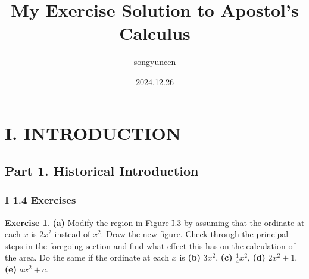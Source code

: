 \documentclass[11pt,a4paper]{book}
\title{My Exercise Solution to Apostol's Calculus}
\author{songyuncen}
\date{2024.12.26}
\theoremstyle{definition}
\newtheorem{exercise}{Exercise}
\begin{document}
\maketitle
\chapter*{I. INTRODUCTION}
\section*{Part 1. Historical Introduction}
\subsection*{I 1.4 Exercises}


\begin{exercise}
  \textbf{(a)} Modify the region in Figure I.3 by assuming that the ordinate at each $x$  is $2x^2$ instead of $x^2$.
  Draw the new figure. Check through the principal steps in the foregoing section and 
  find what effect this has on the calculation of the area. Do the same if the ordinate
  at each $x$ is \textbf{(b)} $3x^2$, \textbf{(c)} $\frac{1}{4}x^2$, \textbf{(d)} $2x^2 + 1$, \textbf{(e)} $ax^2 + c$.
\end{exercise}
\end{document}

